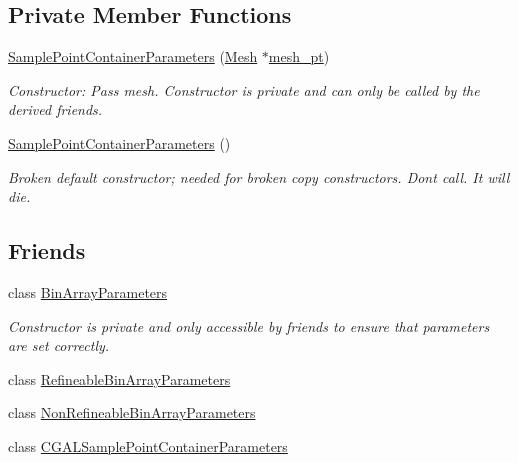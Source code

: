 \subsection*{Private Member Functions}
\begin{DoxyCompactItemize}
\item 
\hyperlink{classoomph_1_1SamplePointContainerParameters_a2513e0c918a2ec86c05ac39318c1c6c3}{Sample\+Point\+Container\+Parameters} (\hyperlink{classoomph_1_1Mesh}{Mesh} $\ast$\hyperlink{classoomph_1_1SamplePointContainerParameters_a92bcab955d47e99d47b601253da7b6b2}{mesh\+\_\+pt})
\begin{DoxyCompactList}\small\item\em Constructor\+: Pass mesh. Constructor is private and can only be called by the derived friends. \end{DoxyCompactList}\item 
\hyperlink{classoomph_1_1SamplePointContainerParameters_a57f37f055a2f3b9509705988d2ee31a5}{Sample\+Point\+Container\+Parameters} ()
\begin{DoxyCompactList}\small\item\em Broken default constructor; needed for broken copy constructors. Don\textquotesingle{}t call. It will die. \end{DoxyCompactList}\end{DoxyCompactItemize}
\subsection*{Friends}
\begin{DoxyCompactItemize}
\item 
class \hyperlink{classoomph_1_1SamplePointContainerParameters_aeb332079314307f60dd3920aa46b8d81}{Bin\+Array\+Parameters}
\begin{DoxyCompactList}\small\item\em Constructor is private and only accessible by friends to ensure that parameters are set correctly. \end{DoxyCompactList}\item 
class \hyperlink{classoomph_1_1SamplePointContainerParameters_a8e6251aa45b1fe0683105714f4d1721a}{Refineable\+Bin\+Array\+Parameters}
\item 
class \hyperlink{classoomph_1_1SamplePointContainerParameters_a63762b7198d7c1a8df01b39c74ba2ad9}{Non\+Refineable\+Bin\+Array\+Parameters}
\item 
class \hyperlink{classoomph_1_1SamplePointContainerParameters_a2c9bab15d3e9295341cb9a94d77b3b9f}{C\+G\+A\+L\+Sample\+Point\+Container\+Parameters}
\end{DoxyCompactItemize}


